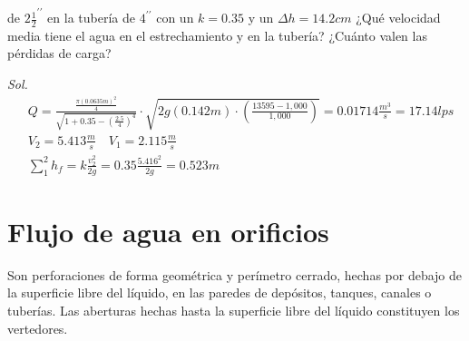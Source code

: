     \begin{problem}
        de $2\frac{1}{2}^{\prime\prime}$ en la tubería de $4^{\prime\prime}$ con un $k=0.35$ y un $\Delta h=14.2cm$ ¿Qué velocidad media tiene el agua en el estrechamiento y en la tubería? ¿Cuánto valen las pérdidas de carga?
    \end{problem}
    \textit{ Sol. }
    \begin{align*}
        &Q = \frac{\frac{\pi(0.0635m)^2}{4}}{\sqrt{1 +0.35 -\left(\frac{2.5}{4}\right)^4}}\cdot \sqrt{2g(0.142m)\cdot \left(\frac{13595 - 1,000}{1,000}\right)} = 0.01714 \frac{m^3}{s} = 17.14lps\\
        &V_2 = 5.413\frac{m}{s}\quad V_1 = 2.115 \frac{m}{s}\\
        &\sum_1^2 h_f = k \frac{v_2^2}{2g} =0.35 \frac{5.416^2}{2g} = 0.523m
    \end{align*}
    
\section{Flujo de agua en orificios}
    
    \begin{definition}[Orificio]
        Son perforaciones de forma geométrica y perímetro cerrado, hechas por debajo de la superficie libre del líquido, en las paredes de depósitos, tanques, canales o tuberías. Las aberturas hechas hasta la superficie libre del líquido
    constituyen los vertedores.
    \end{definition}

